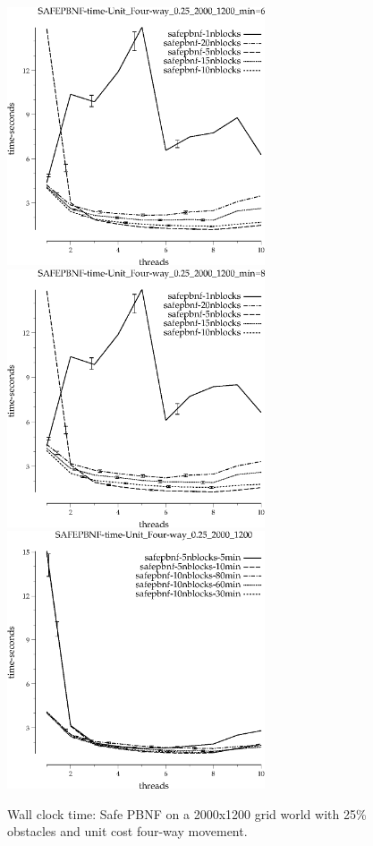 \documentclass{article}
\begin{document}
\begin{figure}[t]
\begin{center}
\includegraphics[width=3in]{grid_unit_four-way_0.25_2000_1200/SAFEPBNF-time-Unit_Four-way_0.25_2000_1200_min=60.eps}
\includegraphics[width=3in]{grid_unit_four-way_0.25_2000_1200/SAFEPBNF-time-Unit_Four-way_0.25_2000_1200_min=80.eps}
\includegraphics[width=3in]{grid_unit_four-way_0.25_2000_1200/SAFEPBNF-time-Unit_Four-way_0.25_2000_1200.eps}
\caption{Wall clock time: Safe PBNF on a 2000x1200 grid world with 25\%
  obstacles and unit cost four-way movement.}
\end{center}
\end{figure}
\end{document}
